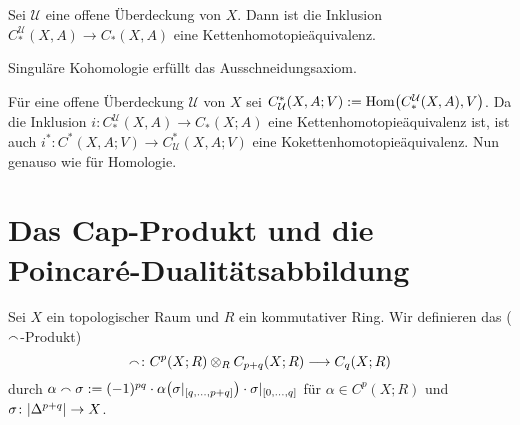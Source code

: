 \begin{korollarB}[{name=[{Inklusion der kleinen Simplizes ist eine Kettenhomotopieäquivalenz}]}]
	Sei $\mathcal{U}$ eine offene Überdeckung von $X$. Dann ist die Inklusion $C^{\mathcal{U}}_*(X,A) \to C_*(X,A)$ eine Kettenhomotopieäquivalenz.
\end{korollarB}

\begin{korollar}[label=korr:ausschneidung_sing_koho,{name=[{Ausschneidung für Kohomologie}]}]
	Singuläre Kohomologie erfüllt das Ausschneidungsaxiom.
\end{korollar}
\begin{beweis}
	Für eine offene Überdeckung $\mathcal{U}$ von $X$ sei $C^*_{\mathcal{U}}(X,A;V) := \Hom \enbrace*{C_*^{\mathcal{U}}(X,A),V}$. Da die Inklusion $i \colon C^{\mathcal{U}}_*(X,A) \to C_*(X;A)$ 
	eine Kettenhomotopieäquivalenz ist, ist auch $i^* \colon C^*(X,A;V) \to C^*_{\mathcal{U}}(X,A;V)$ eine Kokettenhomotopieäquivalenz. Nun genauso wie für Homologie.
\end{beweis}
\newpage

\section{Das Cap-Produkt und die Poincaré-Dualitätsabbildung} %
\label{sec:6}

\begin{definition}[{name=[Cap-Produkt]}]
	Sei $X$ ein topologischer Raum und $R$ ein kommutativer Ring. Wir definieren das  ($\smallfrown$-Produkt)
	\[
		\smallfrown \colon C^p(X;R) \otimes_R C_{p+q}(X;R) \longrightarrow C_q(X;R)
	\]
	durch $\alpha \capp \sigma := (-1)^{pq} \cdot \alpha \enbrace*{\sigma|_{\benbrace*{q,\ldots ,p+q}}} \cdot \sigma|_{\benbrace*{0,\ldots ,q}}$ für $\alpha \in C^p(X;R)$ und 
	$\sigma \colon \lvert\Delta^{p+q}\rvert\to X$.
\end{definition}

